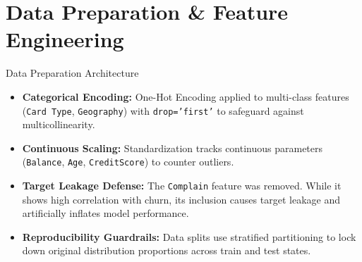 \section{Data Preparation \& Feature Engineering}

\begin{frame}{Data Preparation Architecture}
\begin{itemize}
    \item \textbf{Categorical Encoding:} One-Hot Encoding applied to multi-class features (\texttt{Card Type}, \texttt{Geography}) with \texttt{drop='first'} to safeguard against multicollinearity.
    \item \textbf{Continuous Scaling:} Standardization tracks continuous parameters (\texttt{Balance}, \texttt{Age}, \texttt{CreditScore}) to counter outliers.
    \item \textbf{Target Leakage Defense:} The \texttt{Complain} feature was removed. While it shows high correlation with churn, its inclusion causes target leakage and artificially inflates model performance.
    \item \textbf{Reproducibility Guardrails:} Data splits use stratified partitioning to lock down original distribution proportions across train and test states.
\end{itemize}
\end{frame}


